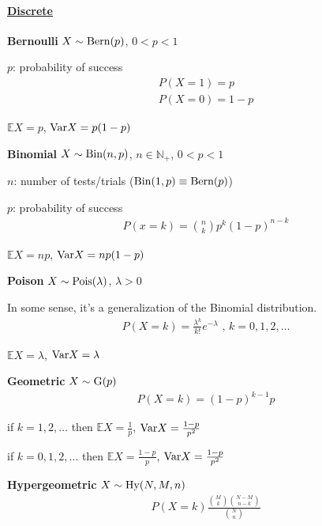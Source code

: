 \paragraph{\underline{Discrete}} \hspace{0pt}

\vspace{10pt} \noindent \textbf{Bernoulli}
$ X \sim \textrm{Bern}(p) $, $0 < p < 1$

$p$: probability of success
\begin{gather*}
P(X=1)=p \\ %
P(X=0)=1-p
\end{gather*}

$ \mathbb{E}X = p$, $\textrm{Var} X = p(1-p) $

\vspace{10pt} \noindent \textbf{Binomial}
$X \sim \textrm{Bin}(n,p)$, $n \in \mathbb{N}_+$, $0 < p < 1$

$n$: number of tests/trials ($\textrm{Bin}(1,p) \equiv \textrm{Bern}(p)$)

$p$: probability of success
\begin{gather*}
P(x=k) = \binom{n}{k} p^k(1-p)^{n-k}
\end{gather*}

$ \mathbb{E}X = np$, $\textrm{Var} X = np(1-p) $

\vspace{10pt} \noindent \textbf{Poison}
$X \sim \textrm{Pois}(\lambda)$, $\lambda > 0$

In some sense, it's a generalization of the Binomial distribution.
\begin{gather*}
P(X=k) = \frac{\lambda^k}{k!}e^{-\lambda} \mbox{ , } k = 0,1,2,\ldots
\end{gather*}

$ \mathbb{E}X = \lambda$, $\textrm{Var} X = \lambda $

\vspace{10pt} \noindent \textbf{Geometric}
$X \sim \textrm{G}(p)$
\begin{gather*}
P(X=k) = (1-p)^{k-1}p
\end{gather*}

if $k=1,2,\ldots$ then $\mathbb{E}X = \frac{1}{p}$, $\textrm{Var} X = \frac{1-p}{p^2}$

if $k=0,1,2,\ldots$ then $\mathbb{E}X = \frac{1-p}{p}$, $\textrm{Var} X = \frac{1-p}{p^2}$

\vspace{10pt} \noindent \textbf{Hypergeometric}
$X \sim \textrm{Hy}(N,M,n)$
\begin{gather*}
P(X=k) \frac{ \binom{M}{k} \binom{N-M}{n-k} }{ \binom{N}{n} }
\end{gather*}

